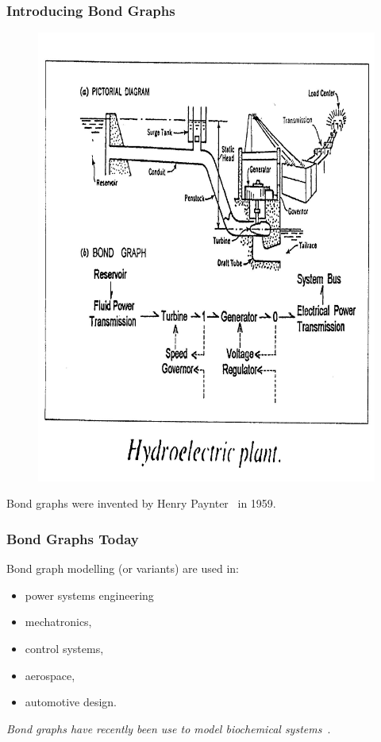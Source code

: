 \documentclass[12pt,reqno]{beamer}
\begin{document}
\begin{frame}
\frametitle{Introducing Bond Graphs}
\begin{figure}
\includegraphics[height=0.6\textheight, width=0.7\linewidth]{hydro.jpg}
\end{figure}
Bond graphs were invented by Henry Paynter~\cite{payter2000} in 1959.
\end{frame}
\begin{frame}
\frametitle{Bond Graphs Today}
Bond graph modelling (or variants) are used in:
\begin{itemize}
	\item power systems engineering 
	\item mechatronics,
	\item control systems,
	\item aerospace,
	\item automotive design.
\end{itemize}
\vspace{10pt}
\emph{Bond graphs have recently been use to model biochemical systems}~\cite{Gaw2017a, Gaw2017b, Gaw2014}.
\end{frame}
\end{document}

